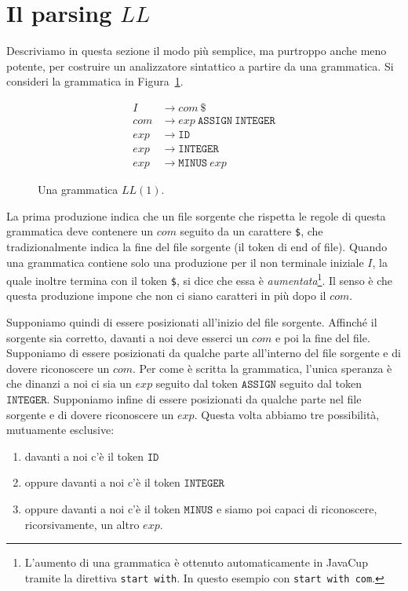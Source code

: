 \section{Il parsing $\mathit{LL}$}\label{sec:ll}
%
Descriviamo in questa sezione il modo pi\`u semplice, ma purtroppo anche
meno potente, per costruire un analizzatore sintattico a partire
da una grammatica. Si consideri la grammatica in Figura~\ref{fig:ll1_grammar}.
%
\begin{figure}[t]
\begin{align*}
  \mathit{I}&\to\mathit{com}\ \mathtt{\$}\\
  \mathit{com}&\to\mathit{exp}\ \mathtt{ASSIGN}\ \mathtt{INTEGER}\\
  \mathit{exp}&\to\mathtt{ID}\\
  \mathit{exp}&\to\mathtt{INTEGER}\\
  \mathit{exp}&\to\mathtt{MINUS}\ \mathit{exp}
\end{align*}
\caption{Una grammatica $\mathit{LL}(1)$.}\label{fig:ll1_grammar}
\end{figure}
%
La prima produzione indica che un file sorgente che rispetta le regole
di questa grammatica deve contenere un $\mathit{com}$ seguito da
un carattere \texttt{\$}, che tradizionalmente
indica la fine del file sorgente (il token di end of file).
Quando una grammatica contiene solo una produzione per il non terminale
iniziale $I$, la quale inoltre termina con il token \texttt{\$},
si dice che essa \`e
\emph{aumentata}\footnote{L'aumento di una grammatica \`e ottenuto
automaticamente in JavaCup tramite la direttiva \texttt{start with}. In questo esempio
con \texttt{start with com}.}.
Il senso \`e che questa produzione impone che non ci siano
caratteri in pi\`u dopo il $\mathit{com}$.

Supponiamo quindi di essere posizionati all'inizio del file sorgente.
Affinch\'e il sorgente sia corretto, davanti a noi deve esserci un
$\mathit{com}$ e poi la fine del file. Supponiamo di essere
posizionati da qualche parte all'interno del file sorgente e di dovere
riconoscere un $\mathit{com}$. Per come \`e scritta la grammatica,
l'unica speranza \`e che dinanzi a noi ci sia un $\mathit{exp}$ seguito dal
token $\mathtt{ASSIGN}$ seguito dal token $\mathtt{INTEGER}$.
Supponiamo infine di essere posizionati da qualche parte nel file sorgente
e di dovere riconoscere un $\mathit{exp}$. Questa volta abbiamo tre
possibilit\`a, mutuamente esclusive:
%
\begin{enumerate}
\item davanti a noi c'\`e il token $\mathtt{ID}$
\item oppure davanti a noi c'\`e il token $\mathtt{INTEGER}$
\item oppure davanti a noi c'\`e il token $\mathtt{MINUS}$ e siamo
      poi capaci di riconoscere, ricorsivamente, un altro $\mathit{exp}$.
\end{enumerate}

